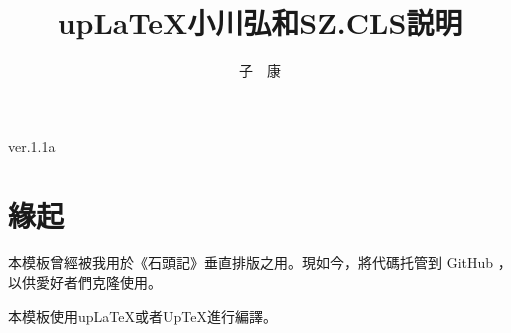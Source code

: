 \documentclass[uplatex,a4paper,10pt]{ujarticle}
\begin{document}

\symkm

\title{\mcfamily\bfseries{up\LaTeX}{小川弘和}{SZ.CLS}{説明}}
\author{子　康}
\maketitle
\begin{center}
{\fontsize{10pt}{12}\selectfont\ttfamily
ver.1.1a
}
\end{center}
\vskip20mm



\section{緣起}
\par 本模板曾經被我用於《石頭記》垂直排版之用。現如今，將代碼托管到 GitHub ，
以供愛好者們克隆使用。
\par 本模板使用{up\LaTeX}或者{Up\TeX}進行編譯。











\end{document}
